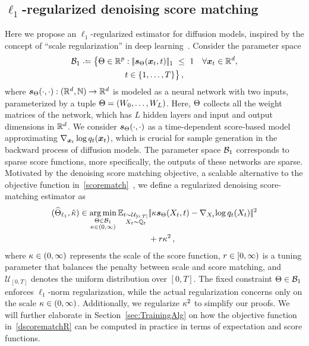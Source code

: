 \subsection{$\ell_1$-regularized denoising score matching}\label{sec:elloneReg}
Here we propose an $\ell_1$-regularized estimator for diffusion models, inspired by the concept of ``scale regularization''  in deep learning~\citep{taheri2021}. Consider the parameter space
\begin{multline}
\label{eq:paramspace}
  \paramspaceone \deq \bigl\{\NetP \in \R^{p}:\norm{\scoref(\x_t,t)}_1~\le~1~~~\forall \x_t\in \R^{\Dim},\\ t\in \{1,\dots,T\} \bigr\}\,,
\end{multline}
where $\textcolor{black}{\textcolor{black}{\boldsymbol{s}}_{\textcolor{black}{\Theta}}}(\cdot,\cdot): (\textcolor{black}{\mathbb{R}}^{\textcolor{black}{d}},\mathbb{N}) \to \textcolor{black}{\mathbb{R}}^{\textcolor{black}{d}}$ is modeled as a neural network with two inputs, parameterized by a tuple $\textcolor{black}{\Theta} = (W_0, \dots, W_L)$. Here, $\textcolor{black}{\Theta}$ collects all the weight matrices of the network, which has $L$ hidden layers and input and output dimensions in $\textcolor{black}{\mathbb{R}}^{\textcolor{black}{d}}$. 
We consider $\textcolor{black}{\textcolor{black}{\boldsymbol{s}}_{\textcolor{black}{\Theta}}}(\cdot,\cdot)$ as a time-dependent score-based model approximating $\nabla_{\textcolor{black}{\boldsymbol{x}}_t} \log q_t(\textcolor{black}{\boldsymbol{x}}_t)$, which is crucial for sample generation in the backward process of diffusion models. 
The parameter space $\textcolor{black}{\mathcal{B}_1}$ corresponds to sparse score functions, more specifically, the outputs of these networks are sparse. 
Motivated by the denoising score matching objective, a scalable alternative to the objective function in~\eqref{scorematch}~\citep{vincent2011connection}, we define a regularized denoising score-matching estimator as
\begin{align}\label{dscorematchR}
 (\textcolor{black}{\widehat{\textcolor{black}{\Theta}}_{\ell_1}},\hat{\kappa})\in \operatorname*{arg\,min}_{\substack{\textcolor{black}{\Theta}\in \textcolor{black}{\mathcal{B}_1} \\ \kappa\in (0,\infty)}}\textcolor{black}{\mathbb{E}}_{\substack{t\sim \mathcal{U}_{[0,T]}\\X_t\sim\mathbb{Q}_t}}&|\!|\kappa\textcolor{black}{\textcolor{black}{\boldsymbol{s}}_{\textcolor{black}{\Theta}}}(X_t,t)-\nabla_{X_t}\!\log q_t(X_t)|\!|^2\notag\\
 &+\textcolor{black}{r} \kappa^2 \,, 
\end{align}
where $\kappa \in (0,\infty)$ represents the scale of the score function, $\textcolor{black}{r} \in [0,\infty)$ is a tuning parameter that balances the penalty between scale and score matching, 
and $\mathcal{U}_{[0,T]}$ denotes the uniform distribution over $[0,T]$.
The fixed constraint $\textcolor{black}{\Theta}\in \textcolor{black}{\mathcal{B}_1}$ enforces $\ell_1$-norm regularization, while the actual regularization concerns only on the scale $\kappa\in (0,\infty)$.
Additionally, we regularize $\kappa^2$  to simplify our proofs.
We will further elaborate in Section~\ref{sec:TrainingAlg}  on how the objective function in~\eqref{dscorematchR} can be computed in practice in terms of expectation and score functions. 



